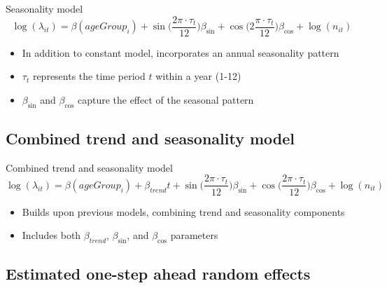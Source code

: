 \documentclass[aspectratio=169,handout]{beamer}
\begin{document}
\begin{frame}{Seasonality model}
\begin{equation}
\log(\lambda_{it})=\beta(ageGroup_{i})+ \sin \bigg(\frac{2\pi\cdot \tau_t}{12}\bigg) \beta_{\sin} + \cos \bigg(2\frac{\pi\cdot \tau_t}{12}\bigg) \beta_{\cos} + \log(n_{it})
\end{equation}

\begin{itemize}
  \item In addition to constant model, incorporates an annual seasonality pattern
  \item $\tau_t$ represents the time period $t$ within a year (1-12)
  \item $\beta_{\sin}$ and $\beta_{\cos}$ capture the effect of the seasonal pattern
\end{itemize}
\end{frame}

\hypertarget{combined-trend-and-seasonality-model}{%
\subsection{Combined trend and seasonality
model}\label{combined-trend-and-seasonality-model}}

\begin{frame}{Combined trend and seasonality model}
\begin{equation}\label{eq:AgegroupTrendSeasonality}
  \log(\lambda_{it})=\beta(ageGroup_{i}) + \beta_{trend} t + \sin \bigg(\frac{2\pi\cdot \tau_t}{12}\bigg) \beta_{\sin} + \cos \bigg(\frac{2\pi\cdot \tau_t}{12}\bigg)\beta_{\cos} + \log(n_{it})
\end{equation}

\begin{itemize}
  \item Builds upon previous models, combining trend and seasonality components
  \item Includes both $\beta_{trend}$, $\beta_{\sin}$, and $\beta_{\cos}$ parameters
\end{itemize}
\end{frame}

\hypertarget{estimated-one-step-ahead-random-effects}{%
\subsection{Estimated one-step ahead random
effects}\label{estimated-one-step-ahead-random-effects}}
\end{document}
